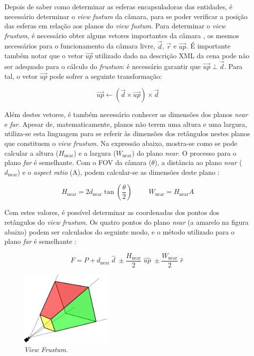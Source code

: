 \documentclass[12pt, a4paper]{article}
\begin{document}
Depois de saber como determinar as esferas encapsuladoras das entidades, é necessário determinar
o \emph{view fustum} da câmara, para se poder verificar a posição das esferas em relação aos planos
do \emph{view fustum}. Para determinar o \emph{view frustum}, é necessário obter alguns vetores
importantes da câmara \cite{lighthouse3d-frustum-planes}, os mesmos necessários para o funcionamento
da câmara livre, $\vec{d}$, $\vec{r}$ e $\vec{up}$. É importante também notar que o vetor $\vec{up}$
utilizado dado na descrição XML da cena pode não ser adequado para o cálculo do \emph{frustum}: é
necessário garantir que $\vec{up} \; \bot \; \vec{d}$. Para tal, o vetor $\vec{up}$ pode sofrer a
seguinte transformação:

$$
\vec{up} \leftarrow \left ( \vec{d} \times \vec{up} \right ) \times \vec{d}
$$

Além destes vetores, é também necessário conhecer as dimensões dos planos \emph{near} e \emph{far}.
Apesar de, matematicamente, planos não terem uma altura e uma largura, utiliza-se esta linguagem
para se referir às dimensões dos retângulos nestes planos que constituem o \emph{view frustum}. Na
expressão abaixo, mostra-se como se pode calcular a altura ($H_\text{near}$) e a largura
($W_\text{near}$) do plano \emph{near}. O processo para o plano \emph{far} é semelhante. Com o FOV
da câmara ($\theta$), a distância ao plano \emph{near} ($d_\text{near}$) e o \emph{aspect ratio}
(A), podem calcular-se as dimensões deste plano \cite{lighthouse3d-frustum-distances}:

$$
H_\text{near} = 2 d_\text{near} \tan \left ( \frac{\theta}{2} \right )
\hspace{1cm}
W_\text{near} = H_\text{near} A
$$

Com estes valores, é possível determinar as coordenadas dos pontos dos retângulos do
\emph{view frustum}. Os quatro pontos do plano \emph{near} (a amarelo na figura abaixo) podem ser
calculados do seguinte modo, e o método utilizado para o plano \emph{far} é semelhante
\cite{lighthouse3d-frustum-planes}:

$$
F = P +
    d_\text{near} \; \widehat{d} \; \pm
    \frac{H_\text{near}}{2} \; \widehat{up} \; \pm
    \frac{W_\text{near}}{2} \; \widehat{r} \;
$$

\begin{figure}[H]
    \centering
    \includegraphics[width=0.4\textwidth]{res/phase2/ViewFrustum.pdf}
    \caption{\emph{View Frustum}.}
\end{figure}
\end{document}
